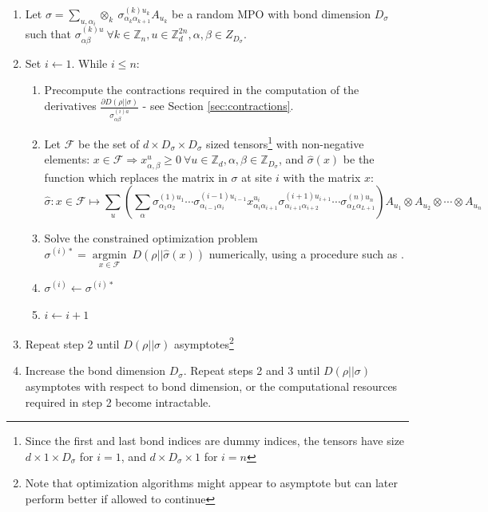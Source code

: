 \documentclass{article}
\begin{document}
\begin{enumerate}
\item Let $\sigma=\sum_{u,\alpha_i} \otimes_k\ \sigma^{(k)u_k}_{\alpha_k\alpha_{k+1}} A_{u_k}$ be a random MPO with bond dimension $D_\sigma$ such that $\sigma^{(k)u}_{\alpha\beta}\ \forall k\in \mathbb Z_n, u\in \mathbb Z_d^{2n},\alpha,\beta\in Z_{D_\sigma}$.
\item Set $i\leftarrow 1$. While $i\leq n$:
	\begin{enumerate}
		\item Precompute the contractions required in the computation of the derivatives $\frac{\partial D(\rho||\sigma)}{\sigma^{(i)a}_{\alpha\beta}}$ - see Section \ref{sec:contractions}.
		\item Let $\mathcal F$ be the set of $d\times D_\sigma\times D_\sigma$ sized tensors\footnote{Since the first and last bond indices are dummy indices, the tensors have size $d\times 1\times D_\sigma$ for $i=1$, and $d\times D_\sigma\times 1$ for $i=n$} with non-negative elements: $x\in\mathcal F\Rightarrow x^u_{\alpha,\beta}\geq 0\ \forall u\in\mathbb Z_d, \alpha,\beta\in\mathbb Z_{D_\sigma}$, and $\hat \sigma(x)$ be the function which replaces the matrix in $\sigma$ at site $i$ with the matrix $x$:
		\begin{equation}\hat \sigma:x\in \mathcal F\mapsto\sum_u\left(\sum_{\alpha}\sigma_{\alpha_1\alpha_2}^{(1)u_1}\cdots \sigma_{\alpha_{i-1}\alpha_i}^{(i-1)u_{i-1}}x^{u_i}_{\alpha_i\alpha_{i+1}}\sigma_{\alpha_{i+1}\alpha_{i+2}}^{(i+1)u_{i+1}}\cdots\sigma_{\alpha_L\alpha_{L+1}}^{(n)u_n}\right)A_{u_1}\otimes A_{u_2}\otimes\cdots\otimes A_{u_n}\end{equation}
		\item Solve the constrained optimization problem $\sigma^{(i)*}=\underset{x\in\mathcal F}{\operatorname{argmin}}\ D(\rho||\hat \sigma(x))$ numerically, using a procedure such as \cite{bfgs_large_scale}.
		\item  $\sigma^{(i)}\leftarrow \sigma^{(i)*}$
		\item $i\leftarrow i+1$
		\end{enumerate}
	\item Repeat step 2 until $D(\rho||\sigma)$ asymptotes\footnote{Note that optimization algorithms might appear to asymptote but can later perform better if allowed to continue}
	\item Increase the bond dimension $D_\sigma$. Repeat steps 2 and 3 until $D(\rho||\sigma)$ asymptotes with respect to bond dimension, or the computational resources required in step 2 become intractable.
\end{enumerate}
\end{document}

